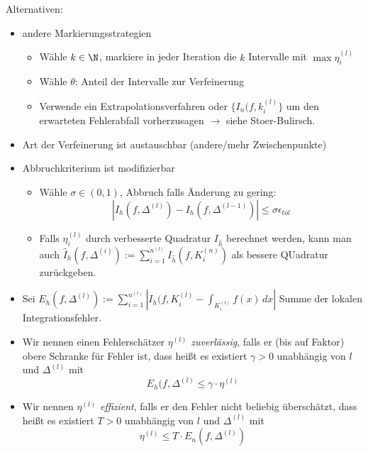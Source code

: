 \documentclass[11pt]{scrartcl}
\begin{document}
\begin{note*}
	Alternativen:
	\begin{itemize}
		\item andere Markierungsstrategien
			\begin{itemize}
				\item Wähle $k\in \N$, markiere in jeder Iteration die $k$ Intervalle mit $\max \eta_i^{(l)}$
				\item Wähle $\theta$: Anteil der Intervalle zur Verfeinerung
				\item Verwende ein Extrapolationsverfahren oder $\{I_n(f, k_i^{(l)}\}$ um den erwarteten Fehlerabfall vorherzusagen $\rightarrow$ siehe Stoer-Bulirsch.
		\end{itemize}
	\item Art der Verfeinerung ist austauschbar (andere/mehr Zwischenpunkte)
	\item Abbruchkriterium ist modifizierbar
		\begin{itemize}
			\item Wähle $\sigma\in (0,1)$, Abbruch falls Änderung zu gering:
				\[
					|I_h(f,\Delta^{(l)})-I_{h}(f, \Delta^{(l-1)} )|\le \sigma \epsilon_{tol}
				\]
			\item Falls $\eta_i^{(l)}$ durch verbesserte Quadratur $I_{\hat h}$ berechnet werden, kann man auch $\hat I_h(f, \Delta^{(i)}):=\sum_{i=1}^{n^{(l)}} I_{\hat h} (f, K_i^{(n)})$ als bessere QUadratur zurückgeben.
		\end{itemize}
\end{itemize}
\end{note*}
\begin{note*}
	\begin{itemize}
		\item Sei $E_h(f, \Delta^{(l)}):= \sum_{i=1}^{n^{(l)}} |I_h(f,K_i^{(l)} - \int_{K_i^{(l)}} f(x)\, dx|$ Summe der lokalen Integrationsfehler.
		\item Wir nennen einen Fehlerschätzer $\eta^{(l)}$ \emph{zuverlässig}, falls er (bis auf Faktor) obere Schranke für Fehler ist, dass heißt es existiert $\gamma >0$ unabhängig von $l$ und $\Delta^{(l)}$ mit 
			\[
				E_h(f, \Delta^{(l)}\le \gamma \cdot \eta^{(l)}
			\]
		\item Wir nennen $\eta^{(l)}$ \emph{effizient}, falls er den Fehler nicht beliebig überschätzt, dass heißt es existiert $T>0$ unabhängig von $l$ und $\Delta^{(l)}$ mit 
			\[
				\eta^{(l)}\le T \cdot E_n(f, \Delta^{(l)})
			\]
	\end{itemize}
\end{note*}
\end{document}
